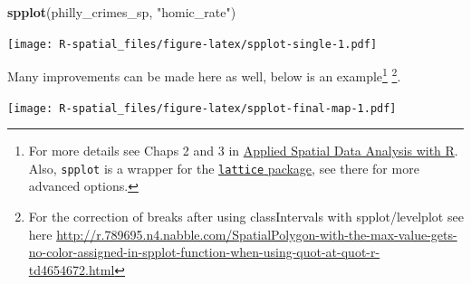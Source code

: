 \documentclass[]{book}
\newenvironment{Shaded}{\begin{snugshade}}{\end{snugshade}}
\newcommand{\KeywordTok}[1]{\textcolor[rgb]{0.13,0.29,0.53}{\textbf{#1}}}
\newcommand{\DataTypeTok}[1]{\textcolor[rgb]{0.13,0.29,0.53}{#1}}
\newcommand{\DecValTok}[1]{\textcolor[rgb]{0.00,0.00,0.81}{#1}}
\newcommand{\FloatTok}[1]{\textcolor[rgb]{0.00,0.00,0.81}{#1}}
\newcommand{\StringTok}[1]{\textcolor[rgb]{0.31,0.60,0.02}{#1}}
\newcommand{\CommentTok}[1]{\textcolor[rgb]{0.56,0.35,0.01}{\textit{#1}}}
\newcommand{\OperatorTok}[1]{\textcolor[rgb]{0.81,0.36,0.00}{\textbf{#1}}}
\newcommand{\NormalTok}[1]{#1}
\let\rmarkdownfootnote\footnote%
\def\footnote{\protect\rmarkdownfootnote}
\begin{document}
\begin{Shaded}
\begin{Highlighting}[]
\KeywordTok{spplot}\NormalTok{(philly_crimes_sp, }\StringTok{"homic_rate"}\NormalTok{)}
\end{Highlighting}
\end{Shaded}

\texttt{[image: R-spatial\_files/figure-latex/spplot-single-1.pdf]}

Many improvements can be made here as well, below is an
example\footnote{For more details see Chaps 2 and 3 in
  \href{https://asdar-book.org}{Applied Spatial Data Analysis with R}.
  Also, \texttt{spplot} is a wrapper for the
  \href{https://cran.r-project.org/package=lattice}{\texttt{lattice}
  package}, see there for more advanced options.} \footnote{For the
  correction of breaks after using classIntervals with spplot/levelplot
  see here
  \url{http://r.789695.n4.nabble.com/SpatialPolygon-with-the-max-value-gets-no-color-assigned-in-spplot-function-when-using-quot-at-quot-r-td4654672.html}}.

\begin{Shaded}
\end{Shaded}

\texttt{[image: R-spatial\_files/figure-latex/spplot-final-map-1.pdf]}
\end{document}
